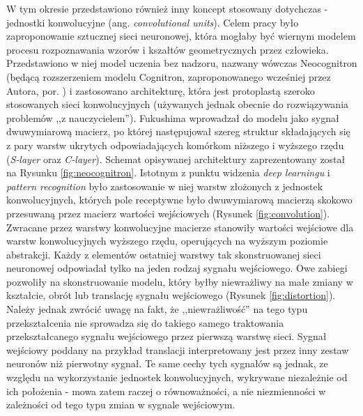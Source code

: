 \documentclass[12pt,a4paper,twoside]{article}
\begin{document}
W tym okresie przedstawiono również inny koncept stosowany dotychczas - jednostki konwolucyjne (ang. \textit{convolutional units}). Celem pracy \citet{fukushima1980} było zaproponowanie sztucznej sieci neuronowej, która mogłaby być wiernym modelem procesu rozpoznawania wzorów i kszałtów geometrycznych przez człowieka. Przedstawiono w niej model uczenia bez nadzoru, nazwany wówczas Neocognitron (będącą rozszerzeniem modelu Cognitron, zaproponowanego wcześniej przez Autora, por. \citet{fukushima1975}) i zastosowano architekturę, która jest protoplastą szeroko stosowanych sieci konwolucyjnych (używanych jednak obecnie do rozwiązywania problemów ,,z nauczycielem''). Fukushima wprowadzał do modelu jako sygnał dwuwymiarową macierz, po której następujował szereg struktur składających się z pary warstw ukrytych odpowiadających komórkom niższego i wyższego rzędu (\textit{S-layer} oraz \textit{C-layer}). Schemat opisywanej architektury zaprezentowany został na Rysunku \ref{fig:neocognitron}. Istotnym z punktu widzenia \textit{deep learningu} i \textit{pattern recognition} było zastosowanie w niej warstw złożonych z jednostek konwolucyjnych, których pole receptywne było dwuwymiarową macierzą skokowo przesuwaną przez macierz wartości wejściowych (Rysunek \ref{fig:convolution}). Zwracane przez warstwy konwolucyjne macierze stanowiły wartości wejściowe dla warstw konwolucyjnych wyższego rzędu, operujących na wyższym poziomie abstrakcji. Każdy z elementów ostatniej warstwy tak skonstruowanej sieci neuronowej odpowiadał tylko na jeden rodzaj sygnału wejściowego. Owe zabiegi pozwoliły na skonstruowanie modelu, który byłby niewrażliwy na małe zmiany w kształcie, obrót lub translację sygnału wejściowego (Rysunek \ref{fig:distortion}). Należy jednak zwrócić uwagę na fakt, że ,,niewrażliwość'' na tego typu przekształcenia nie sprowadza się do takiego samego traktowania przekształcanego sygnału wejściowego przez pierwszą warstwę sieci. Sygnał wejściowy poddany na przykład translacji interpretowany jest przez inny zestaw neuronów niż pierwotny sygnał. Te same cechy tych sygnałów są jednak, ze względu na wykorzystanie jednostek konwolucyjnych, wykrywane niezależnie od ich położenia - mowa zatem raczej o równoważności, a nie niezmienności w zależności od tego typu zmian w sygnale wejściowym.
\end{document}
